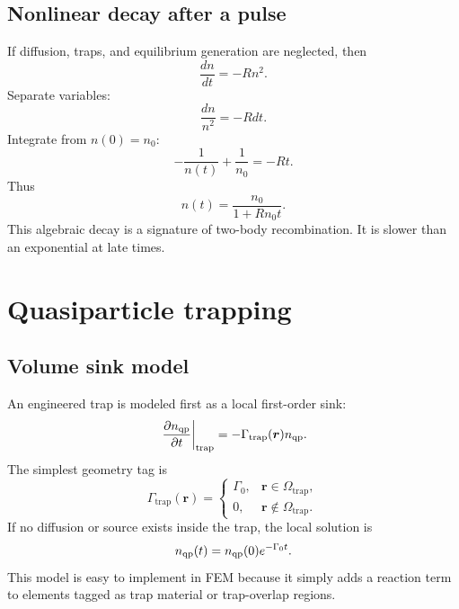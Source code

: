 \documentclass[11pt]{article}
\newcommand{\br}{{\bm{r}}}
\newcommand{\trap}{\mathrm{trap}}
\begin{document}
\subsection{Nonlinear decay after a pulse}
If diffusion, traps, and equilibrium generation are neglected, then
\begin{equation}
\frac{dn}{dt}=-Rn^2.
\end{equation}
Separate variables:
\begin{equation}
\frac{dn}{n^2}=-Rdt.
\end{equation}
Integrate from $n(0)=n_0$:
\begin{equation}
-\frac{1}{n(t)}+\frac{1}{n_0}=-Rt.
\end{equation}
Thus
\begin{equation}
 n(t)=\frac{n_0}{1+R n_0 t}.
\end{equation}
This algebraic decay is a signature of two-body recombination. It is slower than an exponential at late times.

\section{Quasiparticle trapping}

\subsection{Volume sink model}
An engineered trap is modeled first as a local first-order sink:
\begin{equation}
\left.\frac{\partial n_{\qp}}{\partial t}\right|_{\trap}=-\Gamma_{\trap}(\br)n_{\qp}.
\end{equation}
The simplest geometry tag is
\begin{equation}
\Gamma_{\trap}(\br)=
\begin{cases}
\Gamma_0,& \br\in\Omega_{\trap},\\
0,& \br\notin\Omega_{\trap}.
\end{cases}
\end{equation}
If no diffusion or source exists inside the trap, the local solution is
\begin{equation}
 n_{\mathrm{qp}}(t)=n_{\mathrm{qp}}(0)e^{-\Gamma_0t}.
\end{equation}
This model is easy to implement in FEM because it simply adds a reaction term to elements tagged as trap material or trap-overlap regions.
\end{document}
